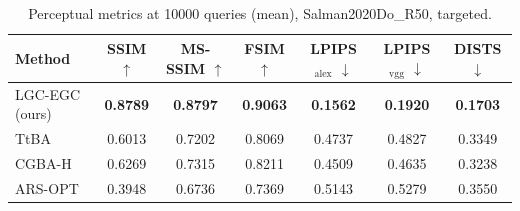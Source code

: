 \begin{table}[t]
\centering\footnotesize
\caption{Perceptual metrics at 10000 queries (mean), Salman2020Do\_R50, targeted.}
\begin{tabular}{lcccccc}
\toprule
Method & SSIM $\uparrow$ & MS-SSIM $\uparrow$ & FSIM $\uparrow$ & LPIPS$_{\mathrm{alex}}$ $\downarrow$ & LPIPS$_{\mathrm{vgg}}$ $\downarrow$ & DISTS $\downarrow$ \\
\midrule
LGC-EGC (ours) & \textbf{0.8789} & \textbf{0.8797} & \textbf{0.9063} & \textbf{0.1562} & \textbf{0.1920} & \textbf{0.1703} \\
TtBA & 0.6013 & 0.7202 & 0.8069 & 0.4737 & 0.4827 & 0.3349 \\
CGBA-H & 0.6269 & 0.7315 & 0.8211 & 0.4509 & 0.4635 & 0.3238 \\
ARS-OPT & 0.3948 & 0.6736 & 0.7369 & 0.5143 & 0.5279 & 0.3550 \\
\bottomrule
\end{tabular}
\end{table}
